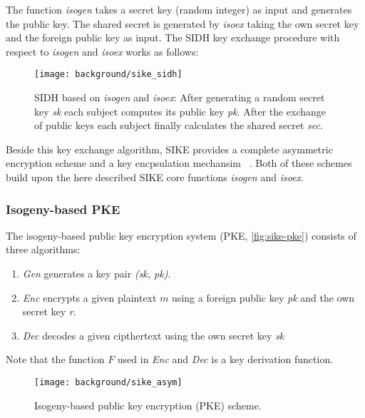 The function \textit{isogen} takes a secret key (random integer) as input and generates the public key. The shared secret is generated by \textit{isoex} taking the own secret key and the foreign public key as input. The \gls{SIDH} key exchange procedure with respect to \textit{isogen} and \textit{isoex} works as follows:


\begin{figure}[H]
  \centering
  \texttt{[image: background/sike\_sidh]}
  \caption[\gls{SIDH} based on \textit{isogen} and \textit{isoex}]{\gls{SIDH} based on \textit{isogen} and \textit{isoex}: After generating a random secret key \textit{sk} each subject computes its public key \textit{pk}. After the exchange of public keys each subject finally calculates the shared secret \textit{sec}.} \label{fig:sike-sidh}
\end{figure}
Beside this key exchange algorithm, SIKE provides a complete asymmetric encryption scheme  and a key encpsulation mechansim  ~\parencite{sike2020spec}. Both of these schemes build upon the here described SIKE core functions \textit{isogen} and \textit{isoex}.

\subsubsection{Isogeny-based PKE}
The isogeny-based public key encryption system (PKE, \autoref{fig:sike-pke}) consists of three algorithms:
\begin{enumerate}
\item \textit{Gen} generates a key pair \textit{(sk, pk)}.
\item \textit{Enc} encrypts a given plaintext $m$ using a foreign public key \textit{pk} and the own secret key \textit{r}.
\item \textit{Dec} decodes a given cipthertext using the own secret key \textit{sk}
\end{enumerate}
Note that the function $F$ used in \textit{Enc} and \textit{Dec} is a key derivation function.

\begin{figure}[H]
  \centering
  \texttt{[image: background/sike\_asym]}
  \caption[Isogeny-based PKE]
  {Isogeny-based public key encryption (PKE) scheme.} \label{fig:sike-pke}
\end{figure}

